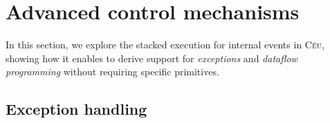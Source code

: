 \documentclass{acm_proc_article-sp}
\newcommand{\CEU}{\textsc{C\'{e}u}\xspace}
\newcommand{\code}[1] {{\small{\texttt{#1}}}}
\newcommand{\1}{\;}
\newcommand{\2}{\;\;}
\newcommand{\3}{\;\;\;}
\newcommand{\5}{\;\;\;\;\;}
\begin{document}

\section{Advanced control mechanisms}
\label{sec.adv}

In this section, we explore the stacked execution for internal events in \CEU, 
showing how it enables to derive support for \emph{exceptions} and 
\emph{dataflow programming} without requiring specific primitives.

\subsection{Exception handling}
\label{sec.adv.excpt}

\end{document}
